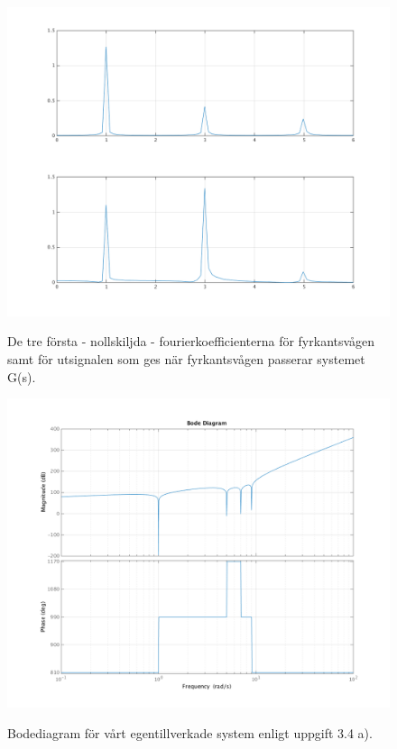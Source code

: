 \begin{figure}
    \caption{De tre första - nollskiljda - fourierkoefficienterna för
    fyrkantsvågen samt för utsignalen som ges när
    fyrkantsvågen passerar systemet G(s).}
    \centering
    \includegraphics[scale=0.55]{figures/task3d+fk.png}
    \label{fig:task3d+fk}
\end{figure}

\begin{figure}
    \caption{Bodediagram för vårt egentillverkade system enligt uppgift 3.4 a).}
    \centering
    \includegraphics[scale=0.55]{figures/task4a-bode.png}
    \label{fig:task4a-bode}
\end{figure}

